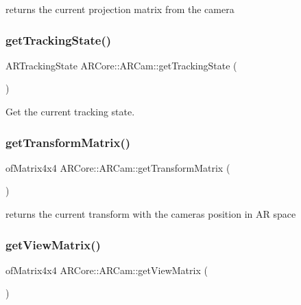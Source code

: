 returns the current projection matrix from the camera 

\mbox{\label{class_a_r_core_1_1_a_r_cam_abef41c0e5914cb2404b26317921d16a1}} 
\subsubsection{\texorpdfstring{get\+Tracking\+State()}{getTrackingState()}}
{\footnotesize\ttfamily A\+R\+Tracking\+State A\+R\+Core\+::\+A\+R\+Cam\+::get\+Tracking\+State (\begin{DoxyParamCaption}{ }\end{DoxyParamCaption})}



Get the current tracking state. 

\mbox{\label{class_a_r_core_1_1_a_r_cam_a280c37d6b4aa16169637cf3f5332c9d3}} 
\subsubsection{\texorpdfstring{get\+Transform\+Matrix()}{getTransformMatrix()}}
{\footnotesize\ttfamily of\+Matrix4x4 A\+R\+Core\+::\+A\+R\+Cam\+::get\+Transform\+Matrix (\begin{DoxyParamCaption}{ }\end{DoxyParamCaption})\hspace{0.3cm}{\ttfamily [inline]}}



returns the current transform with the camera\textquotesingle{}s position in AR space 

\mbox{\label{class_a_r_core_1_1_a_r_cam_a7ca28300844875464c7821620665d3b5}} 
\subsubsection{\texorpdfstring{get\+View\+Matrix()}{getViewMatrix()}}
{\footnotesize\ttfamily of\+Matrix4x4 A\+R\+Core\+::\+A\+R\+Cam\+::get\+View\+Matrix (\begin{DoxyParamCaption}{ }\end{DoxyParamCaption})\hspace{0.3cm}{\ttfamily [inline]}}



